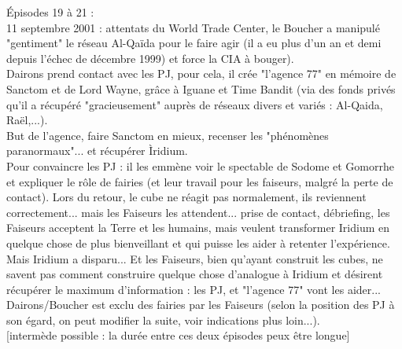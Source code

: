 \documentclass[11pt,twoside,a4paper]{book}
\begin{document}
\clearpage

{\'E}pisodes 19 {\`a} 21 : ~\\
11 septembre 2001 : attentats du World Trade Center, le Boucher a manipul{\'e} "gentiment" le r{\'e}seau Al-Qa{\"i}da pour le faire agir (il a eu plus d'un an et demi depuis l'{\'e}chec de d{\'e}cembre 1999) et force la CIA {\`a} bouger). ~\\
Dairons prend contact avec les PJ, pour cela, il cr{\'e}e "l'agence 77" en m{\'e}moire de Sanctom et de Lord Wayne, gr{\^a}ce {\`a} Iguane et Time Bandit (via des fonds priv{\'e}s qu'il a r{\'e}cup{\'e}r{\'e} "gracieusement" aupr{\`e}s de r{\'e}seaux divers et vari{\'e}s : Al-Qaida, Ra{\"e}l,...). ~\\
But de l'agence, faire Sanctom en mieux, recenser les "ph{\'e}nom{\`e}nes paranormaux"... et r{\'e}cup{\'e}rer {\`I}ridium. ~\\

Pour convaincre les PJ : il les emm{\`e}ne voir le spectable de Sodome et Gomorrhe et expliquer le r{\^o}le de fairies (et leur travail pour les faiseurs, malgr{\'e} la perte de contact). Lors du retour, le cube ne r{\'e}agit pas normalement, ils reviennent correctement... mais les Faiseurs les attendent... prise de contact, d{\'e}briefing, les Faiseurs acceptent la Terre et les humains, mais veulent transformer Iridium en quelque chose de plus bienveillant et qui puisse les aider {\`a} retenter l'exp{\'e}rience. ~\\
Mais Iridium a disparu... Et les Faiseurs, bien qu'ayant construit les cubes, ne savent pas comment construire quelque chose d'analogue {\`a} Iridium et d{\'e}sirent r{\'e}cup{\'e}rer le maximum d'information : les PJ, et "l'agence 77" vont les aider... Dairons/Boucher est exclu des fairies par les Faiseurs (selon la position des PJ {\`a} son {\'e}gard, on peut modifier la suite, voir indications plus loin...). ~\\

[interm{\`e}de possible : la dur{\'e}e entre ces deux {\'e}pisodes peux {\^e}tre longue] ~\\
\end{document}
